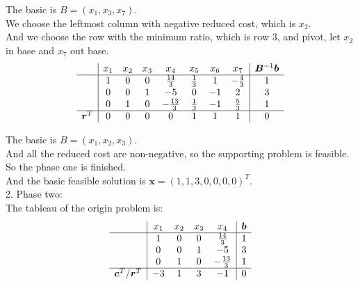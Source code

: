 \documentclass[10pt]{article}
\renewcommand{\mathbf}{\boldsymbol}
\begin{document}
The basic is $B=(x_1,x_3,x_7)$.\\
We choose the leftmost column with negative reduced cost, which is $x_2$.\\
And we choose the row with the minimum ratio, which is row 3, and pivot, let $x_2$ in base and $x_7$ out base.\\

\begin{equation}
	\begin{aligned}
		\begin{array}{c|ccccccc|c}
			& x_1 & x_2 & x_3 & x_4 & x_5 & x_6 & x_7 & \mathbf{B}^{-1}\mathbf{b} \\
			\hline
			& 1 & 0 & 0 & \frac{14}{3} & \frac{1}{3} & 1 & -\frac{4}{3} & 1 \\
			& 0 & 0 & 1 & -5 & 0 & -1 & 2 & 3 \\
			& 0 & 1 & 0 & -\frac{13}{3} & \frac{1}{3} & -1 & \frac{5}{3} & 1 \\
			\hline
			\mathbf{r}^T & 0 & 0 & 0 & 0 & 1 & 1 & 1 & 0 \\
		\end{array}
	\end{aligned}
\end{equation}

The basic is $B=(x_1,x_2,x_3)$.\\
And all the reduced cost are non-negative, so the supporting problem is feasible.\\
So the phase one is finished.\\
And the basic feasible solution is $\mathbf{x}=(1,1,3,0,0,0,0)^T$.\\

2. Phase two:\\
The tableau of the origin problem is:\\
\begin{equation}
	\begin{aligned}
		\begin{array}{c|cccc|c}
			& x_1 & x_2 & x_3 & x_4 & \mathbf{b} \\
			\hline
			& 1 & 0 & 0 & \frac{14}{3} & 1 \\
			& 0 & 0 & 1 & -5 & 3 \\
			& 0 & 1 & 0 & -\frac{13}{3} & 1 \\
			\hline
			\mathbf{c}^T/\mathbf{r}^T & -3 & 1 & 3 & -1 & 0 \\
		\end{array}
	\end{aligned}
\end{equation}
\end{document}
